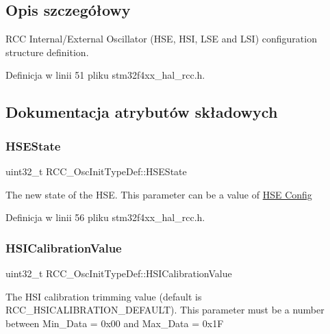 \subsection{Opis szczegółowy}
R\+CC Internal/\+External Oscillator (H\+SE, H\+SI, L\+SE and L\+SI) configuration structure definition. 

Definicja w linii 51 pliku stm32f4xx\+\_\+hal\+\_\+rcc.\+h.



\subsection{Dokumentacja atrybutów składowych}
\mbox{\label{struct_r_c_c___osc_init_type_def_a7e05d6eec98ed8cdaba00ca3d167ff72}} 
\subsubsection{\texorpdfstring{H\+S\+E\+State}{HSEState}}
{\footnotesize\ttfamily uint32\+\_\+t R\+C\+C\+\_\+\+Osc\+Init\+Type\+Def\+::\+H\+S\+E\+State}

The new state of the H\+SE. This parameter can be a value of \hyperlink{group___r_c_c___h_s_e___config}{H\+SE Config} 

Definicja w linii 56 pliku stm32f4xx\+\_\+hal\+\_\+rcc.\+h.

\mbox{\label{struct_r_c_c___osc_init_type_def_a9b2e48e452d0c334f2b9473216064560}} 
\subsubsection{\texorpdfstring{H\+S\+I\+Calibration\+Value}{HSICalibrationValue}}
{\footnotesize\ttfamily uint32\+\_\+t R\+C\+C\+\_\+\+Osc\+Init\+Type\+Def\+::\+H\+S\+I\+Calibration\+Value}

The H\+SI calibration trimming value (default is R\+C\+C\+\_\+\+H\+S\+I\+C\+A\+L\+I\+B\+R\+A\+T\+I\+O\+N\+\_\+\+D\+E\+F\+A\+U\+LT). This parameter must be a number between Min\+\_\+\+Data = 0x00 and Max\+\_\+\+Data = 0x1F 

